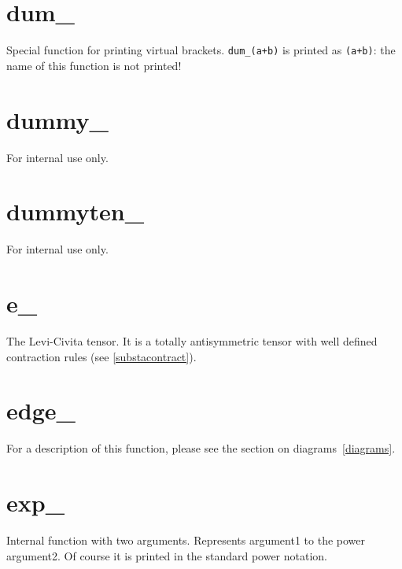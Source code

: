 
\section{dum\_}
\label{fundum}
\noindent Special function for printing virtual 
brackets. \verb:dum_(a+b): is printed as \verb:(a+b):: the 
name of this function is not printed!


\section{dummy\_}
\label{fundummy}
\noindent For internal use only.


\section{dummyten\_}
\label{fundummyten}
\noindent For internal use only.


\section{e\_}
\label{fune}
\noindent The Levi-Civita 
tensor. It is a totally 
antisymmetric tensor with well defined contraction 
rules (see \ref{substacontract}).


\section{edge\_}
\label{funedge}
\noindent For a description of this function, please see the section on 
diagrams~\ref{diagrams}.


\section{exp\_}
\label{funexp}
\noindent Internal function with two arguments. Represents 
argument1 to the power argument2. Of course it is printed in the standard 
power notation.

